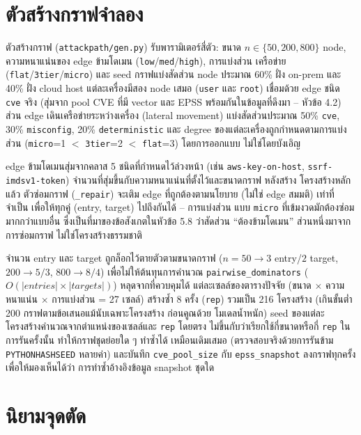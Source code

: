 \section{ตัวสร้างกราฟจำลอง}

ตัวสร้างกราฟ (\texttt{attackpath/gen.py}) รับพารามิเตอร์สี่ตัว: ขนาด $n \in \{50, 200, 800\}$
node, ความหนาแน่นของ edge ข้ามโดเมน (\texttt{low}/\texttt{med}/\texttt{high}), การแบ่งส่วน
เครือข่าย (\texttt{flat}/\texttt{3tier}/\texttt{micro}) และ seed กราฟแบ่งสัดส่วน node ประมาณ
60\% ฝั่ง on-prem และ 40\% ฝั่ง cloud host แต่ละเครื่องมีสอง node เสมอ (\texttt{user} และ
\texttt{root}) เชื่อมด้วย edge ชนิด \texttt{cve} จริง (สุ่มจาก pool CVE ที่มี vector และ EPSS
พร้อมกันในข้อมูลที่ดึงมา -- หัวข้อ 4.2) ส่วน edge เดินเครือข่ายระหว่างเครื่อง (lateral
movement) แบ่งสัดส่วนประมาณ 50\% \texttt{cve}, 30\% \texttt{misconfig}, 20\%
\texttt{deterministic} และ degree ของแต่ละเครื่องถูกกำหนดตามการแบ่งส่วน
(\texttt{micro}=1 $<$ \texttt{3tier}=2 $<$ \texttt{flat}=3) โดยการออกแบบ ไม่ใช่โดยบังเอิญ

edge ข้ามโดเมนสุ่มจากคลาส 5 ชนิดที่กำหนดไว้ล่วงหน้า (เช่น \texttt{aws-key-on-host},
\texttt{ssrf-imdsv1-token}) จำนวนที่สุ่มขึ้นกับความหนาแน่นที่ตั้งไว้และขนาดกราฟ หลังสร้าง
โครงสร้างหลักแล้ว ตัวซ่อมกราฟ (\texttt{\_repair}) จะเติม edge ที่ถูกต้องตามนโยบาย
(ไม่ใช่ edge สมมติ) เท่าที่จำเป็น เพื่อให้ทุกคู่ (entry, target) ไปถึงกันได้ -- การแบ่งส่วน
แบบ \texttt{micro} ที่เข้มงวดมักต้องซ่อมมากกว่าแบบอื่น ซึ่งเป็นที่มาของข้อสังเกตในหัวข้อ
5.8 ว่าสัดส่วน ``ต้องข้ามโดเมน'' ส่วนหนึ่งมาจากการซ่อมกราฟ ไม่ใช่โครงสร้างธรรมชาติ

จำนวน entry และ target ถูกล็อกไว้ตายตัวตามขนาดกราฟ ($n{=}50{\to}3$ entry/$2$ target,
$200{\to}5/3$, $800{\to}8/4$) เพื่อไม่ให้ต้นทุนการคำนวณ \texttt{pairwise\_dominators}
($O(|entries| \times |targets|)$) หลุดจากที่ควบคุมได้ แต่ละเซลล์ของตารางปัจจัย (ขนาด
$\times$ ความหนาแน่น $\times$ การแบ่งส่วน = 27 เซลล์) สร้างซ้ำ 8 ครั้ง (\texttt{rep})
รวมเป็น 216 โครงสร้าง (เกินขั้นต่ำ 200 กราฟตามข้อเสนอแม้นับเฉพาะโครงสร้าง ก่อนคูณด้วย
โมเดลน้ำหนัก) seed ของแต่ละโครงสร้างคำนวณจากตำแหน่งของเซลล์และ \texttt{rep} โดยตรง
ไม่ขึ้นกับว่าเรียกใช้กี่ขนาดหรือกี่ \texttt{rep} ในการรันครั้งนั้น ทำให้กราฟชุดย่อยใด ๆ ทำซ้ำได้
เหมือนเดิมเสมอ (ตรวจสอบจริงด้วยการรันข้าม \texttt{PYTHONHASHSEED} หลายค่า) และบันทึก
\texttt{cve\_pool\_size} กับ \texttt{epss\_snapshot} ลงกราฟทุกครั้ง เพื่อให้มองเห็นได้ว่า
การทำซ้ำอ้างอิงข้อมูล snapshot ชุดใด

\section{นิยามจุดตัด}

